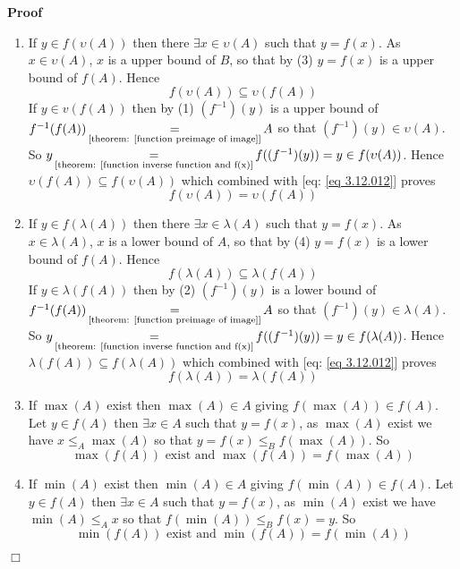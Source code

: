\documentclass{book}
\newcommand{\equallim}{\mathop{=}\limits}
\newenvironment{proof}{\noindent\textbf{Proof\ }}{\hspace*{\fill}$\Box$\medskip}
\begin{document}
\begin{proof}
\begin{enumerate}
    \item  If $y \in f (\upsilon (A))$ then there $\exists x \in \upsilon (A)$
    such that $y = f (x)$. As $x \in \upsilon (A)$, $x$ is a upper bound of
    $B$, so that by (3) $y = f (x)$ is a upper bound of $f (A)$. Hence
    \begin{equation}
      \label{eq 3.12.012} f (\upsilon (A)) \subseteq \upsilon (f (A))
    \end{equation}
    If $y \in v (f (A))$ then by (1) $(f^{- 1}) (y)$ is a upper bound of $f^{-
    1} (f (A)) \equallim_{\text{[theorem: \ref{function preimage of image}]}}
    A$ so that $(f^{- 1}) (y) \in \upsilon (A)$. So $y
    \equallim_{\text{[theorem: \ref{function inverse function and f(x)}}} f
    ((f^{- 1}) (y)) = y \in f (\upsilon (A))$. Hence $\upsilon (f (A))
    \subseteq f (\upsilon (A))$ which combined with [eq: \ref{eq 3.12.012}]
    proves
    \[ f (\upsilon (A)) = \upsilon (f (A)) \]
    \item If $y \in f (\lambda (A))$ then there $\exists x \in \lambda (A)$
    such that $y = f (x)$. As $x \in \lambda (A)$, $x$ is a lower bound of
    $A$, so that by (4) $y = f (x)$ is a lower bound of $f (A)$. Hence
    \begin{equation}
      \label{eq 3.14.012} f (\lambda (A)) \subseteq \lambda (f (A))
    \end{equation}
    If $y \in \lambda (f (A))$ then by (2) $(f^{- 1}) (y)$ is a lower bound of
    $f^{- 1} (f (A)) \equallim_{\text{[theorem: \ref{function preimage of
    image}]}} A$ so that $(f^{- 1}) (y) \in \lambda (A)$. So $y
    \equallim_{\text{[theorem: \ref{function inverse function and f(x)}}} f
    ((f^{- 1}) (y)) = y \in f (\lambda (A))$. Hence $\lambda (f (A)) \subseteq
    f (\lambda (A))$ which combined with [eq: \ref{eq 3.12.012}] proves
    \[ f (\lambda (A)) = \lambda (f (A)) \]
    \item If $\max (A)$ exist then $\max (A) \in A$ giving $f (\max (A)) \in f
    (A)$. Let $y \in f (A)$ then $\exists x \in A$ such that $y = f (x)$, as
    $\max (A)$ exist we have $x \leqslant_A \max (A)$ so that $y = f (x)
    \leqslant_B f (\max (A))$. So
    \[ \max (f (A)) \text{ exist and } \max (f (A)) = f (\max (A)) \]
    \item If $\min (A)$ exist then $\min (A) \in A$ giving $f (\min (A)) \in f
    (A)$. Let $y \in f (A)$ then $\exists x \in A$ such that $y = f (x)$, as
    $\min (A)$ exist we have $\min (A) \leqslant_A x$ so that $f (\min (A))
    \leqslant_B f (x) = y$. So
    \[ \min (f (A)) \text{ exist and } \min (f (A)) = f (\min (A)) \]

\end{enumerate}
\end{proof}
\end{document}
